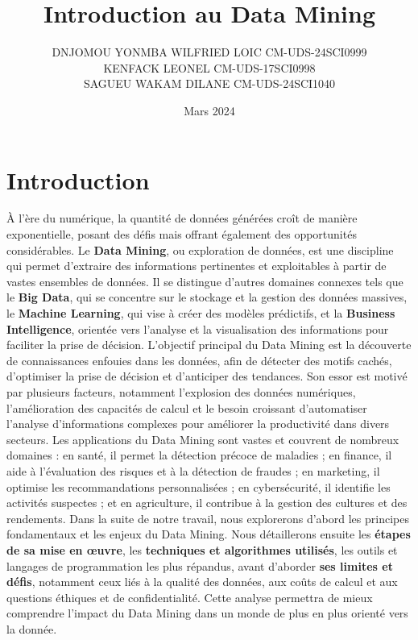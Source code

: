 \documentclass[a4paper,12pt]{article}
\title{ Introduction au Data Mining}
\author{DNJOMOU YONMBA WILFRIED LOIC CM-UDS-24SCI0999 \\
KENFACK LEONEL CM-UDS-17SCI0998\\
SAGUEU WAKAM DILANE CM-UDS-24SCI1040\\}
\date{Mars 2024}
\begin{document}
\maketitle

\renewcommand{\contentsname}{Table des matières}

\tableofcontents
\thispagestyle{empty}
\newpage
\listoffigures
\newpage

\renewcommand{\chaptername}{Chapitre}

    \section*{Introduction}
	À l’ère du numérique, la quantité de données générées croît de manière exponentielle, posant des défis mais offrant également des opportunités considérables. Le \textbf{Data Mining}, ou exploration de données, est une discipline qui permet d’extraire des informations pertinentes et exploitables à partir de vastes ensembles de données. Il se distingue d’autres domaines connexes tels que le \textbf{Big Data}, qui se concentre sur le stockage et la gestion des données massives, le \textbf{Machine Learning}, qui vise à créer des modèles prédictifs, et la \textbf{Business Intelligence}, orientée vers l’analyse et la visualisation des informations pour faciliter la prise de décision. L’objectif principal du Data Mining est la découverte de connaissances enfouies dans les données, afin de détecter des motifs cachés, d’optimiser la prise de décision et d’anticiper des tendances. Son essor est motivé par plusieurs facteurs, notamment l’explosion des données numériques, l’amélioration des capacités de calcul et le besoin croissant d’automatiser l’analyse d’informations complexes pour améliorer la productivité dans divers secteurs. Les applications du Data Mining sont vastes et couvrent de nombreux domaines : en santé, il permet la détection précoce de maladies ; en finance, il aide à l’évaluation des risques et à la détection de fraudes ; en marketing, il optimise les recommandations personnalisées ; en cybersécurité, il identifie les activités suspectes ; et en agriculture, il contribue à la gestion des cultures et des rendements. Dans la suite de notre travail, nous explorerons d’abord les principes fondamentaux et les enjeux du Data Mining. Nous détaillerons ensuite les \textbf{étapes de sa mise en œuvre}, les \textbf{techniques et algorithmes utilisés}, les outils et langages de programmation les plus répandus, avant d’aborder \textbf{ses limites et défis}, notamment ceux liés à la qualité des données, aux coûts de calcul et aux questions éthiques et de confidentialité. Cette analyse permettra de mieux comprendre l’impact du Data Mining dans un monde de plus en plus orienté vers la donnée.
\newpage
\end{document}
